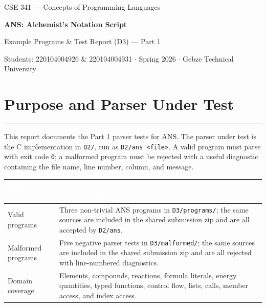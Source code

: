\documentclass[11pt,a4paper]{article}
\newcommand{\code}[1]{\texttt{#1}}
\newcommand{\sectionrule}{\vspace{-3pt}\textcolor{ansborder}{\rule{\textwidth}{0.6pt}}\vspace{2pt}}
\begin{document}
\begin{center}
  {\footnotesize\color{anscaption}
    CSE 341 --- Concepts of Programming Languages\par}
  \vspace{4pt}
  {\Huge\bfseries\sffamily
    ANS: Alchemist's Notation Script\par}
  \vspace{6pt}
  {\Large Example Programs \& Test Report (D3) --- Part 1\par}
  \vspace{8pt}
  {\footnotesize\color{anscaption}
    Students: 220104004926 \& 220104004931 \quad$\cdot$\quad
    Spring 2026 \quad$\cdot$\quad
    Gebze Technical University\par}
\end{center}
\vspace{8pt}

\section{Purpose and Parser Under Test}
\sectionrule

This report documents the Part 1 parser tests for ANS. The parser under test is the C implementation in \code{D2/}, run as \code{D2/ans <file>}. A valid program must parse with exit code \code{0}; a malformed program must be rejected with a useful diagnostic containing the file name, line number, column, and message.

\begin{table}[h]
\centering
{}
\begin{tabularx}{\textwidth}{@{} L{3.1cm} Y @{}}
\toprule
{}
\textcolor{white}{\textbf{Evidence item}} & \textcolor{white}{\textbf{D3 coverage}} \\
\midrule
Valid programs & Three non-trivial ANS programs in \code{D3/programs/}; the same sources are included in the shared submission zip and are all accepted by \code{D2/ans}. \\
Malformed programs & Five negative parser tests in \code{D3/malformed/}; the same sources are included in the shared submission zip and are all rejected with line-numbered diagnostics. \\
Domain coverage & Elements, compounds, reactions, formula literals, energy quantities, typed functions, control flow, lists, calls, member access, and index access. \\
\bottomrule
\end{tabularx}
\end{table}
\end{document}
